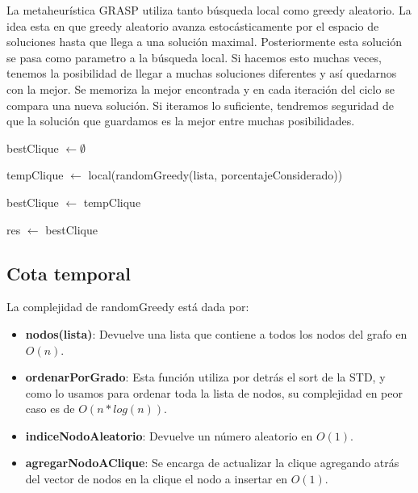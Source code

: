 La metaheurística GRASP utiliza tanto búsqueda local como greedy aleatorio. La idea esta en que greedy aleatorio avanza estocásticamente por el espacio de soluciones hasta que llega a una solución maximal. Posteriormente esta solución se pasa como parametro a la búsqueda local. Si hacemos esto muchas veces, tenemos la posibilidad de llegar a muchas soluciones diferentes y así quedarnos con la mejor. Se memoriza la mejor encontrada y en cada iteración del ciclo se compara una nueva solución. Si iteramos lo suficiente, tendremos seguridad de que la solución que guardamos es la mejor entre muchas posibilidades. 

\begin{algorithm}[H]
	\NoCaptionOfAlgo
	\caption{}

	bestClique $\leftarrow \emptyset$
	 
	{
		tempClique $\leftarrow$ local(randomGreedy(lista, porcentajeConsiderado))
		 
		{
			bestClique $\leftarrow$ tempClique
		}
		 
	}
	
	res $\leftarrow$ bestClique

\end{algorithm}

\subsection{Cota temporal}
La complejidad de randomGreedy está dada por:

\begin{itemize}
    \item \textbf{nodos(lista)}: Devuelve una lista que contiene a todos los nodos del grafo en $O(n)$.

	\item \textbf{ordenarPorGrado}: Esta función utiliza por detrás el sort de la STD, y como lo usamos para ordenar toda la lista de nodos, su complejidad en peor caso es de $O(n*log(n))$.

	\item \textbf{indiceNodoAleatorio}: Devuelve un número aleatorio en $O(1)$.

	\item \textbf{agregarNodoAClique}: Se encarga de actualizar la clique agregando atrás del vector de nodos en la clique el nodo a insertar en $O(1)$.	

\end{itemize}

